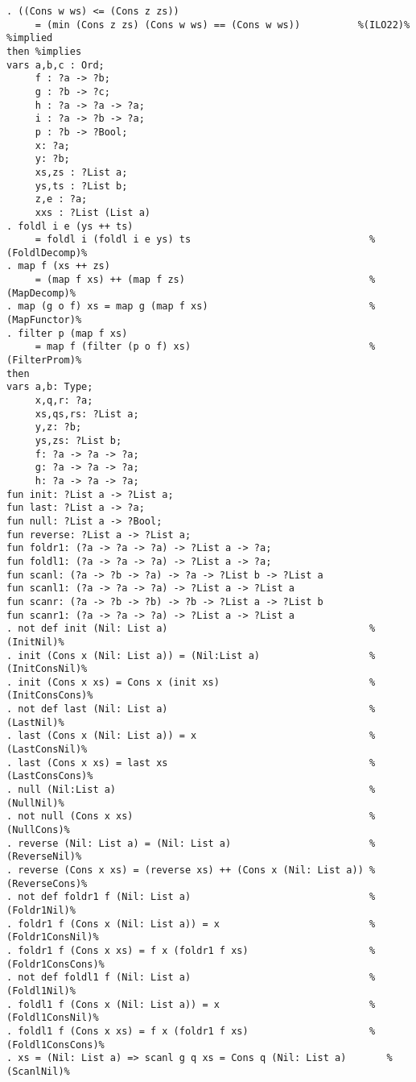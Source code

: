 \begin{Verbatim}
. ((Cons w ws) <= (Cons z zs))
     = (min (Cons z zs) (Cons w ws) == (Cons w ws))          %(ILO22)% %implied
then %implies
vars a,b,c : Ord;
     f : ?a -> ?b;
     g : ?b -> ?c;
     h : ?a -> ?a -> ?a;
     i : ?a -> ?b -> ?a;
     p : ?b -> ?Bool;
     x: ?a;
     y: ?b;
     xs,zs : ?List a;
     ys,ts : ?List b;
     z,e : ?a;
     xxs : ?List (List a)
. foldl i e (ys ++ ts) 
     = foldl i (foldl i e ys) ts                               %(FoldlDecomp)%
. map f (xs ++ zs) 
     = (map f xs) ++ (map f zs)                                %(MapDecomp)%
. map (g o f) xs = map g (map f xs)                            %(MapFunctor)%
. filter p (map f xs) 
     = map f (filter (p o f) xs)                               %(FilterProm)%
then
vars a,b: Type;
     x,q,r: ?a;
     xs,qs,rs: ?List a;
     y,z: ?b;
     ys,zs: ?List b;
     f: ?a -> ?a -> ?a;
     g: ?a -> ?a -> ?a;
     h: ?a -> ?a -> ?a;
fun init: ?List a -> ?List a;
fun last: ?List a -> ?a;
fun null: ?List a -> ?Bool;
fun reverse: ?List a -> ?List a;
fun foldr1: (?a -> ?a -> ?a) -> ?List a -> ?a;
fun foldl1: (?a -> ?a -> ?a) -> ?List a -> ?a;
fun scanl: (?a -> ?b -> ?a) -> ?a -> ?List b -> ?List a
fun scanl1: (?a -> ?a -> ?a) -> ?List a -> ?List a
fun scanr: (?a -> ?b -> ?b) -> ?b -> ?List a -> ?List b
fun scanr1: (?a -> ?a -> ?a) -> ?List a -> ?List a
. not def init (Nil: List a)                                   %(InitNil)%
. init (Cons x (Nil: List a)) = (Nil:List a)                   %(InitConsNil)%
. init (Cons x xs) = Cons x (init xs)                          %(InitConsCons)%
. not def last (Nil: List a)                                   %(LastNil)%
. last (Cons x (Nil: List a)) = x                              %(LastConsNil)%
. last (Cons x xs) = last xs                                   %(LastConsCons)%
. null (Nil:List a)                                            %(NullNil)%
. not null (Cons x xs)                                         %(NullCons)%
. reverse (Nil: List a) = (Nil: List a)                        %(ReverseNil)%
. reverse (Cons x xs) = (reverse xs) ++ (Cons x (Nil: List a)) %(ReverseCons)%
. not def foldr1 f (Nil: List a)                               %(Foldr1Nil)%
. foldr1 f (Cons x (Nil: List a)) = x                          %(Foldr1ConsNil)%
. foldr1 f (Cons x xs) = f x (foldr1 f xs)                     %(Foldr1ConsCons)%
. not def foldl1 f (Nil: List a)                               %(Foldl1Nil)%
. foldl1 f (Cons x (Nil: List a)) = x                          %(Foldl1ConsNil)%
. foldl1 f (Cons x xs) = f x (foldr1 f xs)                     %(Foldl1ConsCons)%
. xs = (Nil: List a) => scanl g q xs = Cons q (Nil: List a)       %(ScanlNil)%

\end{Verbatim}
